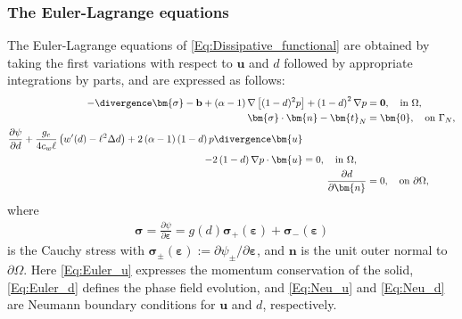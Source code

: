 \subsubsection{The Euler-Lagrange equations}

The Euler-Lagrange equations of \eqref{Eq:Dissipative_functional} are obtained by {taking} the first variations with respect to $\bm{u}$ and $d$ {followed by appropriate integrations by parts}, and are expressed as follows:
\begin{subequations}\label{Eq:Euler}
    \begin{align}
         \label{Eq:Euler_u}  {-}\divergence\bm{\sigma} - \mathbf{b} +
        \left(\alpha-1\right) \nabla  \left[ (1-d)^2 p\right] + \left(1-d \right)^2 \nabla p &= \mathbf{0}, \quad  \text{in~} \Omega, \\
        \label{Eq:Neu_u} \bm{\sigma}\cdot\bm{n} - \bm{t}_N &= \bm{0}, \quad \text{on~} \Gamma_N, \\
        \begin{split}
                  \label{Eq:Euler_d} \frac{\partial\psi}{\partial d} + \frac{g_c}{4c_{w}\ell}\left({w}'(d) - {\ell}^2 \Delta d\right)
        + 2 \left(\alpha-1\right) \left(1-d \right)p\divergence \bm{u}
        \\- 2\left(1-d\right)\nabla p\cdot\bm{u} &= 0, \quad  \text{in~} \Omega, 
        \end{split}
          \\
        \label{Eq:Neu_d} \frac{\partial d}{\partial \bm{n}} &= 0, \quad  \text{on~} \partial\Omega,
    \end{align}
\end{subequations}
where
\begin{equation*}
    \begin{aligned}
        \bm{\sigma} =\frac{\partial\psi}{\partial\bm{\varepsilon}} = g(d) \bm{\sigma}_+(\bm{\varepsilon}) + \bm{\sigma}_-(\bm{\varepsilon})
    \end{aligned}
\end{equation*}
is the Cauchy stress with $\bm{\sigma}_\pm(\bm{\varepsilon}):=\partial\psi_\pm/\partial\bm{\varepsilon}$, and $\bm{n}$ is the unit outer normal to $\partial\Omega$. Here \eqref{Eq:Euler_u} expresses the momentum conservation of the solid, \eqref{Eq:Euler_d} defines the phase field evolution, and \eqref{Eq:Neu_u} and \eqref{Eq:Neu_d} are Neumann boundary conditions for $\bm{u}$ and $d$, respectively.


